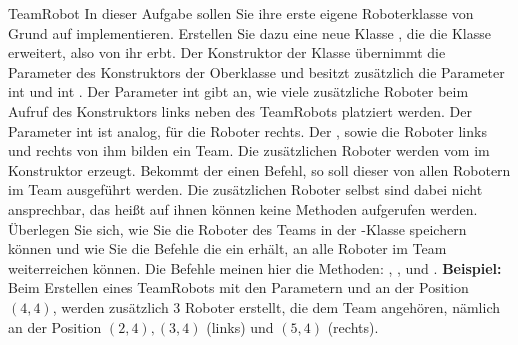 \documentclass{../preamble}
\begin{document}
\clearpage

\begin{task}[credit = \stars{3}{3}]{TeamRobot}
    In dieser Aufgabe sollen Sie ihre erste eigene Roboterklasse von Grund auf implementieren. Erstellen Sie dazu eine neue Klasse , die die Klasse  erweitert, also von ihr erbt. Der Konstruktor der Klasse  übernimmt die Parameter des Konstruktors der Oberklasse  und besitzt zusätzlich die Parameter \textcolor{keywordcolor}{int}  und \textcolor{keywordcolor}{int} . Der Parameter \textcolor{keywordcolor}{int}  gibt an, wie viele zusätzliche Roboter beim Aufruf des Konstruktors links neben des TeamRobots platziert werden. Der Parameter \textcolor{keywordcolor}{int}  ist analog, für die Roboter rechts. Der , sowie die Roboter links und rechts von ihm bilden ein Team. Die zusätzlichen Roboter werden vom  im Konstruktor erzeugt. Bekommt der  einen Befehl, so soll dieser von allen Robotern im Team ausgeführt werden. Die zusätzlichen Roboter selbst sind dabei nicht ansprechbar, das heißt auf ihnen können keine Methoden aufgerufen werden. Überlegen Sie sich, wie Sie die Roboter des Teams in der -Klasse speichern können und wie Sie die Befehle die ein  erhält, an alle Roboter im Team weiterreichen können. Die Befehle meinen hier die Methoden: , ,  und .
    \br
    \textbf{Beispiel:} Beim Erstellen eines TeamRobots mit den Parametern  und  an der Position \((4, 4)\), werden zusätzlich 3 Roboter erstellt, die dem Team angehören, nämlich an der Position \((2, 4), (3, 4)\) (links) und \((5, 4)\) (rechts).
    \clearpage

    \begin{solution}
        
    \end{solution}
\end{task}

\clearpage
\end{document}
